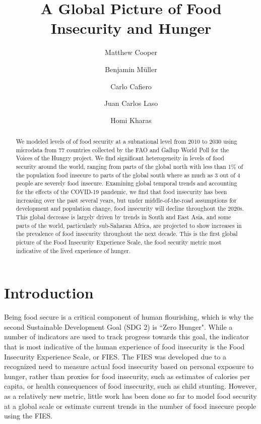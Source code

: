 \documentclass{article}
\begin{document}
\title{A Global Picture of Food Insecurity and Hunger}

\author[1,2,*]{Matthew Cooper}
\author[2,3]{Benjamin Müller}
\author[4]{Carlo Cafiero}
\author[2,5]{Juan Carlos Laso}
\author[2,6]{Homi Kharas}


\maketitle
\begin{abstract}
We modeled levels of of food security at a subnational level from 2010 to 2030 using microdata from 77 countries collected by the FAO and Gallup World Poll for the Voices of the Hungry project.  We find significant heterogeneity in levels of food security around the world, ranging from parts of the global north with less than 1\% of the population food insecure to parts of the global south where as much as 3 out of 4 people are severely food insecure.  Examining global temporal trends and accounting for the effects of the COVID-19 pandemic, we find that food insecurity has been increasing over the past several years, but under middle-of-the-road assumptions for development and population change, food insecurity will decline throughout the 2020s.  This global decrease is largely driven by trends in South and East Asia, and some parts of the world, particularly sub-Saharan Africa, are projected to show increases in the prevalence of food insecurity throughout the next decade. This is the first global picture of the Food Insecurity Experience Scale, the food security metric most indicative of the lived experience of hunger.
\end{abstract}

\section{Introduction}
Being food secure is a critical component of human flourishing, which is why the second Sustainable Development Goal (SDG 2) is ``Zero Hunger".  While a number of indicators are used to track progress towards this goal, the indicator that is most indicative of the human experience of food insecurity is the Food Insecurity Experience Scale, or FIES.  The FIES was developed due to a recognized need to measure actual food insecurity based on personal exposure to hunger, rather than proxies for food insecurity, such as estimates of calories per capita, or health consequences of food insecurity, such as child stunting.  However, as a relatively new metric, little work has been done so far to model food security at a global scale or estimate current trends in the number of food insecure people using the FIES.
\end{document}
